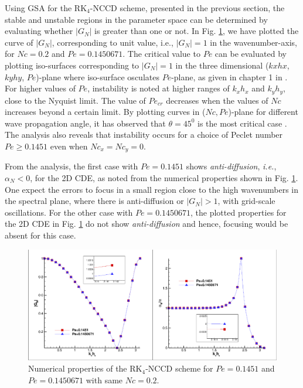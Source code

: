 \documentclass[showpacs,preprintnumbers,amsmath,amssymb]{revtex4-1} %
\begin{document}
Using GSA for the RK$_4$-NCCD scheme, presented in the previous section, the stable and unstable regions in the parameter space can be determined by evaluating whether $|G_N|$ is greater than one or not. In Fig. \ref{fig_NCCD_focus}, we have plotted the curve of $|G_N|$, corresponding to unit value, i.e., $|G_N|=1$ in the wavenumber-axis, for $Nc=0.2$ and $Pe=0.1450671$. The critical value to $Pe$ can be evaluated by plotting iso-surfaces corresponding to $|G_N|=1$ in the three dimensional ($kxhx$, $kyhy$, $Pe$)-plane where iso-surface osculates $Pe$-plane, as given in chapter 1 in \cite{pirozzoli2019}. For higher values of $Pe$, instability is noted at higher ranges of $k_xh_x$ and $k_yh_y$, close to the Nyquist limit. The value of $Pe_{cr}$ decreases when the values of $Nc$ increases beyond a certain limit. By plotting curves in ($Nc, Pe$)-plane for different wave propagation angle, it has observed that $\theta=45^0$ is the most critical case \cite{pirozzoli2019}. The analysis also reveals that instability occurs for a choice of Peclet number $Pe\geq0.1451$ even when $Nc_x=Nc_y=0$.

From the analysis, the first case with $Pe=0.1451$ shows \textit{anti-diffusion}, \textit{i.e.}, $\alpha_N<0$, for the 2D CDE, as noted from the numerical properties shown in Fig. \ref{fig_NCCD_focus}.  One expect the errors to focus in a small region close to the high wavenumbers in the spectral plane, where there is anti-diffusion or $|G_N| > 1$, with grid-scale oscillations. For the other case with $Pe=0.1450671$, the plotted properties for the 2D CDE in Fig. \ref{fig_NCCD_focus} do not show \textit{anti-diffusion} and hence, focusing would be absent for this case.

\begin{figure}[h]
\begin{center}
\includegraphics[width=150mm]{NCCD_focus.pdf}
\end{center}
\raggedleft
\caption{Numerical properties of the RK$_4$-NCCD scheme for $Pe=0.1451$ and $Pe=0.1450671$ with same $Nc=0.2$.}
\label{fig_NCCD_focus}
\end{figure}
\end{document}
